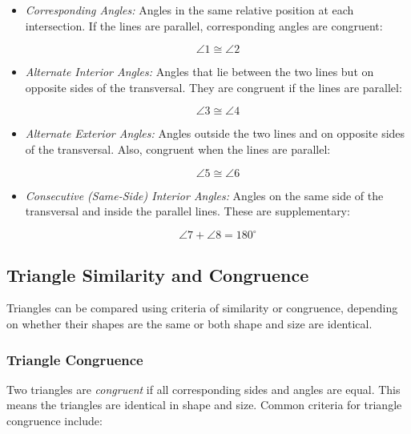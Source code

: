 \begin{itemize}

	\item \emph{Corresponding Angles:} Angles in the same relative position at each intersection. If the 
	lines are parallel, corresponding angles are congruent:
	 
		\[
 		   \angle 1 \cong \angle 2
   		\]
    
    \item \emph{Alternate Interior Angles:} Angles that lie between the two lines but on opposite sides 
	of the transversal. They are congruent if the lines are parallel:
    
		\[
  		  \angle 3 \cong \angle 4
    	\]
    
    \item \emph{Alternate Exterior Angles:} Angles outside the two lines and on opposite sides of the 
	transversal. Also, congruent when the lines are parallel:
    
		\[
 		   \angle 5 \cong \angle 6
    	\]
    
    \item \emph{Consecutive (Same-Side) Interior Angles:} Angles on the same side of the transversal and 
	inside the parallel lines. These are supplementary:
    
		  \[
 	   			\angle 7 + \angle 8 = 180^\circ
   	      \]
\end{itemize}

\subsection{Triangle Similarity and Congruence}

Triangles can be compared using criteria of similarity or congruence, depending on whether their shapes 
are the same or both shape and size are identical.

\subsubsection{Triangle Congruence}

Two triangles are \emph{congruent} if all corresponding sides and angles are equal. This means the 
triangles are identical in shape and size. Common criteria for triangle congruence include:

